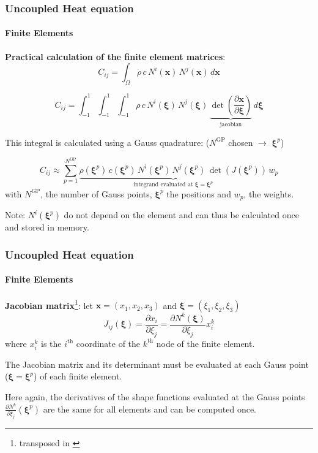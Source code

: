 \documentclass[10pt,xcolor=pdftex,dvipsnames,table]{beamer}
\begin{document}
\begin{frame}
	\frametitle{ Uncoupled Heat equation }
	\framesubtitle{ Finite Elements }
	\textbf{Practical calculation of the finite element matrices}:
	\begin{equation*}
		C_{ij} = \int_{\Omega}\rho\,c\, N^i(\boldsymbol{x})\, N^j(\boldsymbol{x}) \,d\boldsymbol{x}
	\end{equation*}

	\begin{equation*}
		C_{ij} = \int_{-1}^1\int_{-1}^1\int_{-1}^1\rho\,c\, N^i(\boldsymbol{\xi})\, N^j(\boldsymbol{\xi}) \, \underbrace{\det (\frac{\partial{\boldsymbol{x}} }{\partial\boldsymbol{\xi}})}_{\text{jacobian}} \,d\boldsymbol{\xi}
	\end{equation*}

	This integral is calculated using a Gauss quadrature: ($N^{\text{GP}}$ chosen $\rightarrow$  $\boldsymbol{\xi}^p$)
	
	
	\begin{equation*}
		C_{ij} \approx \sum_{p=1}^{N^{\text{GP}}} \underbrace{\rho(\boldsymbol{\xi}^p)\,c(\boldsymbol{\xi}^p)\, N^i(\boldsymbol{\xi}^p)\, N^j(\boldsymbol{\xi}^p) \, \det (J(\boldsymbol{\xi}^p))}_{\text{integrand evaluated at } \boldsymbol{\xi}=\boldsymbol{\xi}^p} \,w_p
	\end{equation*}	
	with $N^{\text{GP}}$, the number of Gauss points, $\boldsymbol{\xi}^p$ the positions and $w_p$, the weights.


	Note: $N^i(\boldsymbol{\xi}^p)$ do not depend on the element and can thus be calculated once and stored in memory. 

\end{frame}


\begin{frame}
	\frametitle{ Uncoupled Heat equation }
	\framesubtitle{ Finite Elements }

	\textbf{Jacobian matrix}\footnote{transposed in \cite{ponthot2020}}: let $\boldsymbol{x}=(x_1, x_2, x_3)$ and $\boldsymbol{\xi}=(\xi_1, \xi_2, \xi_3)$
	\begin{equation*}
		J_{ij} (\boldsymbol{\xi}) =\frac{\partial x_i}{\partial \xi_j} = \frac{\partial N^k (\boldsymbol{\xi})}{\partial \xi_j} x_i^k
	\end{equation*}	
	where $x_i^k$ is the $i^{\text{th}}$ coordinate of the $k^{\text{th}}$ node of the finite element.	

	The Jacobian matrix and its determinant must be evaluated at each Gauss point ($\boldsymbol{\xi}=\boldsymbol{\xi}^p$) of each finite element. 
	
		
	Here again, the derivatives of the shape functions evaluated at the Gauss points $\frac{\partial N^k}{\partial \xi_j} (\boldsymbol{\xi}^p)$ are the same for all elements and can be computed once.	
		
\end{frame}
\end{document}
